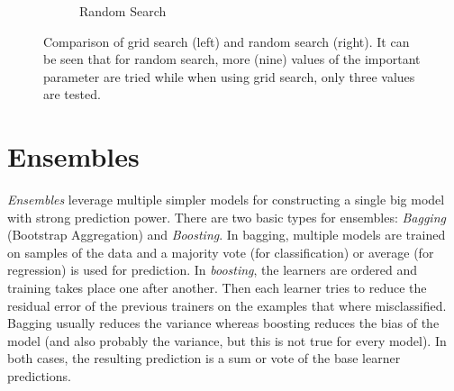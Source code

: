 \begin{figure}
\begin{subfigure}{0.49\linewidth}
					\caption{Random Search}
				\end{subfigure}
				\caption{Comparison of grid search (left) and random search (right). It can be seen that for random search, more (nine) values of the important parameter are tried while when using grid search, only three values are tested.}
				\label{fig:gridRandomSearch}
			\end{figure}

	\section{Ensembles}
		\emph{Ensembles} leverage multiple simpler models for constructing a single big model with strong prediction power. There are two basic types for ensembles: \emph{Bagging} (Bootstrap Aggregation) and \emph{Boosting}. In bagging, multiple models are trained on samples of the data and a majority vote (for classification) or average (for regression) is used for prediction. In \emph{boosting}, the learners are ordered and training takes place one after another. Then each learner tries to reduce the residual error of the previous trainers on the examples that where misclassified. Bagging usually reduces the variance whereas boosting reduces the bias of the model (and also probably the variance, but this is not true for every model). In both cases, the resulting prediction is a sum or vote of the base learner predictions.

